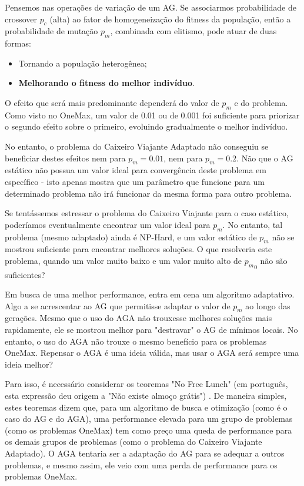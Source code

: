 Pensemos nas operações de variação de um AG. Se associarmos probabilidade de crossover $p_c$ (alta) ao fator de homogeneização do fitness da população, então a probabilidade de mutação $p_m$, combinada com elitismo, pode atuar de duas formas:

\begin{itemize}
	\item Tornando a população heterogênea;
	\item \textbf{Melhorando o fitness do melhor indivíduo}.
\end{itemize}

O efeito que será mais predominante dependerá do valor de $p_m$ e do problema. Como visto no OneMax, um valor de 0.01 ou de 0.001 foi suficiente para priorizar o segundo efeito sobre o primeiro, evoluindo gradualmente o melhor indivíduo.

No entanto, o problema do Caixeiro Viajante Adaptado não conseguiu se beneficiar destes efeitos nem para $p_m=0.01$, nem para $p_m=0.2$. Não que o AG estático não possua um valor ideal para convergência deste problema em específico - isto apenas mostra que um parâmetro que funcione para um determinado problema não irá funcionar da mesma forma para outro problema.

Se tentássemos estressar o problema do Caixeiro Viajante para o caso estático, poderíamos eventualmente encontrar um valor ideal para $p_m$. No entanto, tal problema (mesmo adaptado) ainda é NP-Hard, e um valor estático de $p_m$ não se mostrou suficiente para encontrar melhores soluções. O que resolveria este problema, quando um valor muito baixo e um valor muito alto de ${p_m}_0$ não são suficientes?

Em busca de uma melhor performance, entra em cena um algoritmo adaptativo. Algo a se acrescentar ao AG que permitisse adaptar o valor de $p_m$ ao longo das gerações. Mesmo que o uso do AGA não trouxesse melhores soluções mais rapidamente, ele se mostrou melhor para "destravar" o AG de mínimos locais. No entanto, o uso do AGA não trouxe o mesmo benefício para os problemas OneMax. Repensar o AGA é uma ideia válida, mas usar o AGA será sempre uma ideia melhor?

Para isso, é necessário considerar os teoremas "No Free Lunch" (em português, esta expressão deu origem a "Não existe almoço grátis") \cite{wolpert1997no}. De maneira simples, estes teoremas dizem que, para um algoritmo de busca e otimização (como é o caso do AG e do AGA), uma performance elevada para um grupo de problemas (como os problemas OneMax) tem como preço uma queda de performance para os demais grupos de problemas (como o problema do Caixeiro Viajante Adaptado). O AGA tentaria ser a adaptação do AG para se adequar a outros problemas, e mesmo assim, ele veio com uma perda de performance para os problemas OneMax.

